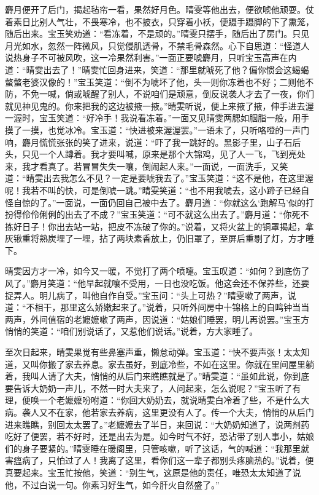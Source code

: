 麝月便开了后门，揭起毡帘一看，果然好月色。晴雯等他出去，便欲唬他顽耍。仗着素日比别人气壮，不畏寒冷，也不披衣，只穿着小袄，便蹑手蹑脚的下了熏笼，随后出来。宝玉笑劝道：“看冻着，不是顽的。”晴雯只摆手，随后出了房门。只见月光如水，忽然一阵微风，只觉侵肌透骨，不禁毛骨森然。心下自思道：“怪道人说热身子不可被风吹，这一冷果然利害。”一面正要唬麝月，只听宝玉高声在内道：“晴雯出去了！”晴雯忙回身进来，笑道：“那里就唬死了他？偏你惯会这蝎蝎螫螫老婆汉像的！”宝玉笑道：“倒不为唬坏了他，头一则你冻着也不好；二则他不防，不免一喊，倘或唬醒了别人，不说咱们是顽意，倒反说袭人才去了一夜，你们就见神见鬼的。你来把我的这边被掖一掖。”晴雯听说，便上来掖了掖，伸手进去渥一渥时，宝玉笑道：“好冷手！我说看冻着。”一面又见晴雯两腮如胭脂一般，用手摸了一摸，也觉冰冷。宝玉道：“快进被来渥渥罢。”一语未了，只听咯噔的一声门响，麝月慌慌张张的笑了进来，说道：“吓了我一跳好的。黑影子里，山子石后头，只见一个人蹲着。我才要叫喊，原来是那个大锦鸡，见了人一飞，飞到亮处来，我才看真了。若冒冒失失一嚷，倒闹起人来。”一面说，一面洗手，又笑道：“晴雯出去我怎么不见？一定是要唬我去了。”宝玉笑道：“这不是他，在这里渥呢！我若不叫的快，可是倒唬一跳。”晴雯笑道：“也不用我唬去，这小蹄子已经自怪自惊的了。”一面说，一面仍回自己被中去了。麝月道：“你就这么‘跑解马’似的打扮得伶伶俐俐的出去了不成？”宝玉笑道：“可不就这么出去了。”麝月道：“你死不拣好日子！你出去站一站，把皮不冻破了你的。”说着，又将火盆上的铜罩揭起，拿灰锹重将熟炭埋了一埋，拈了两块素香放上，仍旧罩了，至屏后重剔了灯，方才睡下。

晴雯因方才一冷，如今又一暖，不觉打了两个喷嚏。宝玉叹道：“如何？到底伤了风了。”麝月笑道：“他早起就嚷不受用，一日也没吃饭。他这会还不保养些，还要捉弄人。明儿病了，叫他自作自受。”宝玉问：“头上可热？”晴雯嗽了两声，说道：“不相干，那里这么娇嫩起来了。”说着，只听外间房中十锦格上的自鸣钟当当两声，外间值宿的老嬷嬷嗽了两声，因说道：“姑娘们睡罢，明儿再说罢。”宝玉方悄悄的笑道：“咱们别说话了，又惹他们说话。”说着，方大家睡了。

至次日起来，晴雯果觉有些鼻塞声重，懒怠动弹。宝玉道：“快不要声张！太太知道，又叫你搬了家去养息。家去虽好，到底冷些，不如在这里。你就在里间屋里躺着，我叫人请了大夫，悄悄的从后门来瞧瞧就是了。”晴雯道：“虽如此说，你到底要告诉大奶奶一声儿，不然一时大夫来了，人问起来，怎么说呢？”宝玉听了有理，便唤一个老嬷嬷吩咐道：“你回大奶奶去，就说晴雯白冷着了些，不是什么大病。袭人又不在家，他若家去养病，这里更没有人了。传一个大夫，悄悄的从后门进来瞧瞧，别回太太罢了。”老嬷嬷去了半日，来回说：“大奶奶知道了，说两剂药吃好了便罢，若不好时，还是出去为是。如今时气不好，恐沾带了别人事小，姑娘们的身子要紧的。”晴雯睡在暖阁里，只管咳嗽，听了这话，气的喊道：“我那里就害瘟病了，只怕过了人！我离了这里，看你们这一辈子都别头疼脑热的。”说着，便真要起来。宝玉忙按他，笑道：“别生气，这原是他的责任，唯恐太太知道了说他，不过白说一句。你素习好生气，如今肝火自然盛了。”


